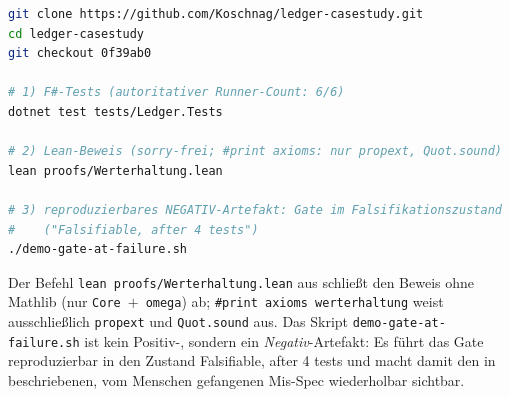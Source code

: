 \documentclass[11pt,a4paper]{article}
\theoremstyle{definition}
\theoremstyle{remark}
\begin{document}
\begin{lstlisting}[language=bash,caption={Ledger: $6/6$ Tests, \texttt{sorry}-freier Lean-Beweis, reproduzierbares Negativ-Artefakt.},label={lst:repro-ledger}]
git clone https://github.com/Koschnag/ledger-casestudy.git
cd ledger-casestudy
git checkout 0f39ab0

# 1) F#-Tests (autoritativer Runner-Count: 6/6)
dotnet test tests/Ledger.Tests

# 2) Lean-Beweis (sorry-frei; #print axioms: nur propext, Quot.sound)
lean proofs/Werterhaltung.lean

# 3) reproduzierbares NEGATIV-Artefakt: Gate im Falsifikationszustand
#    ("Falsifiable, after 4 tests")
./demo-gate-at-failure.sh
\end{lstlisting}

\noindent
Der Befehl \texttt{lean proofs/Werterhaltung.lean} aus 
schließt den Beweis ohne Mathlib (nur \texttt{Core}~$+$~\texttt{omega}) ab;
\texttt{\#print axioms werterhaltung} weist ausschließlich \texttt{propext} und
\texttt{Quot.sound} aus. Das Skript \texttt{demo-gate-at-failure.sh} ist kein
Positiv-, sondern ein \emph{Negativ}-Artefakt: Es führt das Gate reproduzierbar in
den Zustand \glqq Falsifiable, after 4 tests\grqq{} und macht damit den in
 beschriebenen, vom Menschen gefangenen Mis-Spec
wiederholbar sichtbar.
\end{document}
